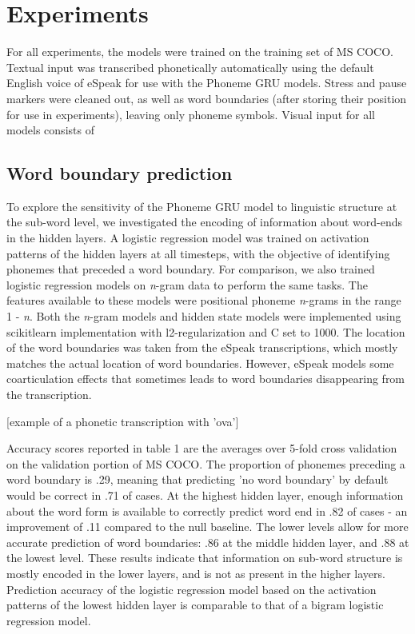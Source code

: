 \section{Experiments}
\label{sec:experiments}

For all experiments, the models were trained on the training set of MS COCO. Textual input was transcribed phonetically automatically using the default English voice of eSpeak for use with the {\sc Phoneme GRU} models. Stress and pause markers were cleaned out, as well as word boundaries (after storing their position for use in experiments), leaving only phoneme symbols. Visual input for all models consists of %

\subsection{Word boundary prediction}
To explore the sensitivity of the {\sc Phoneme GRU} model to linguistic structure at the sub-word level, we investigated the encoding of information about word-ends in the hidden layers. A logistic regression model was trained on activation patterns of the hidden layers at all timesteps, with the objective of identifying phonemes that preceded a word boundary. For comparison, we also trained logistic regression models on \textit{n}-gram data to perform the same tasks. The features available to these models were positional phoneme \textit{n}-grams in the range 1 - \textit{n}. Both the \textit{n}-gram models and hidden state models were implemented using scikitlearn implementation with l2-regularization and C set to 1000. The location of the word boundaries was taken from the eSpeak transcriptions, which mostly matches the actual location of word boundaries. However, eSpeak models some coarticulation effects that sometimes leads to word boundaries disappearing from the transcription.

[example of a phonetic transcription with 'ova']

Accuracy scores reported in table 1 are the averages over 5-fold cross validation on the validation portion of MS COCO. The proportion of phonemes preceding a word boundary is .29, meaning that predicting 'no word boundary' by default would be correct in .71 of cases. At the highest hidden layer, enough information about the word form is available to correctly predict word end in .82 of cases - an improvement of .11 compared to the null baseline. The lower levels allow for more accurate prediction of word boundaries: .86 at the middle hidden layer, and .88 at the lowest level. These results indicate that information on sub-word structure is mostly encoded in the lower layers, and is not as present in the higher layers. %
Prediction accuracy of the logistic regression model based on the activation patterns of the lowest hidden layer is comparable to that of a bigram logistic regression model.

